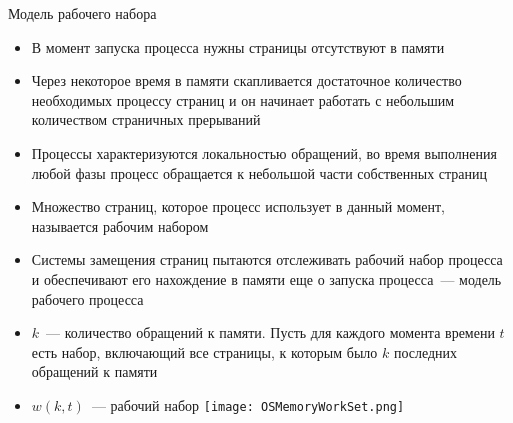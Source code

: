 \documentclass[aspectratio=169,14pt]{beamer}
\begin{document}
\begin{frame}{Модель рабочего набора}
    \begin{tiny}
    \begin{spacing}{0.4}
    \begin{itemize}
        \item В момент запуска процесса нужны страницы отсутствуют в памяти
        \item Через некоторое время в памяти скапливается достаточное
        количество необходимых процессу страниц и он начинает работать с
        небольшим количеством страничных прерываний
        \item Процессы характеризуются локальностью обращений, во время
        выполнения любой фазы процесс обращается к небольшой части
        собственных страниц
        \item Множество страниц, которое процесс использует в данный момент,
        называется рабочим набором
        \item Системы замещения страниц пытаются отслеживать рабочий набор
        процесса и обеспечивают его нахождение в памяти еще о запуска
        процесса~--- модель рабочего процесса
        \item $k$~--- количество обращений к памяти. Пусть для каждого
        момента времени $t$ есть набор, включающий все страницы,
        $к$ которым было $k$ последних обращений к памяти
        \item $w(k,t)$~--- рабочий набор
        \texttt{[image: OSMemoryWorkSet.png]}
    \end{itemize}
    \end{spacing}
    \end{tiny}
\end{frame}
\end{document}

